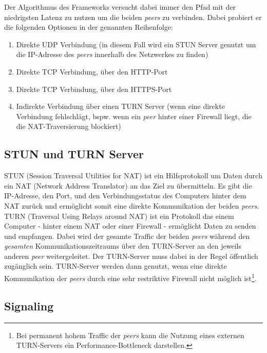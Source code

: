 Der Algorithmus des Frameworks versucht dabei immer den Pfad mit der niedrigsten Latenz zu nutzen um die beiden \textit{peers} zu verbinden.
Dabei probiert er die folgenden Optionen in der genannten Reihenfolge:

\begin{enumerate}
    \item Direkte UDP Verbindung (in diesem Fall wird ein STUN Server genutzt um die IP-Adresse des \textit{peers} innerhalb des Netzwerkes zu finden)
    \item Direkte TCP Verbindung, über den HTTP-Port
    \item Direkte TCP Verbindung, über den HTTPS-Port
    \item Indirekte Verbindung über einen TURN Server (wenn eine direkte Verbindung fehlschlägt, bspw. wenn ein \textit{peer} hinter einer
    Firewall liegt, die die NAT-Traversierung blockiert)\parencite{MDNIce}
\end{enumerate}

\subsection{STUN und TURN Server}
\label{subsec:natturnserver}
STUN (Session Traversal Utilities for NAT) ist ein Hilfsprotokoll um Daten durch ein NAT (Network Address Translator) an das Ziel zu übermitteln.
Es gibt die IP-Adresse, den Port, und den Verbindungsstatus des Computers hinter dem NAT zurück\parencite{MDNStun} und ermöglicht somit
eine direkte Kommunikation der beiden \textit{peers}.
\newline
TURN (Traversal Using Relays around NAT) ist ein Protokoll das einem Computer - hinter einem NAT oder einer Firewall - ermöglicht Daten zu senden und empfangen.
Dabei wird der gesamte Traffic der beiden \textit{peers} während den \textit{gesamten} Kommunikationszeitraums über den TURN-Server an den jeweils anderen \textit{peer} weitergeleitet.
Der TURN-Server muss dabei in der Regel öffentlich zugänglich sein.
TURN-Server werden dann genutzt, wenn eine direkte Kommunikation der \textit{peers} durch eine sehr restriktive Firewall nicht möglich ist\footnote{
    Bei permanent hohem Traffic der \textit{peers} kann die Nutzung eines externen TURN-Servers ein Performance-Bottleneck darstellen.}\parencite{MDNTurn}.

\subsection{Signaling}
\label{subsec:signaling}

